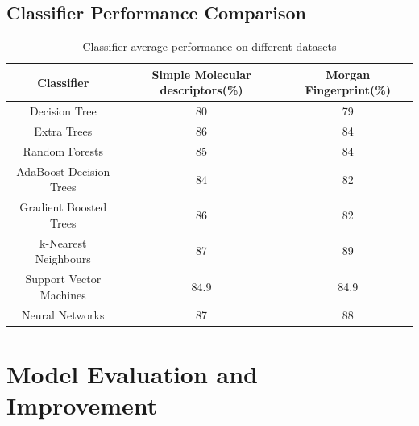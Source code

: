 \documentclass[a4paper,12pt]{report}
\begin{document}
			\subsection{Classifier Performance Comparison}
			\begin{table}[ht]
				\caption{Classifier average performance on different datasets}
				\centering
				\begin{tabular}{c|c|c}	
					\hline\hline
					Classifier & Simple Molecular descriptors(\%) & Morgan Fingerprint(\%) \\
					\hline
					Decision Tree & 80 & 79 \\
					Extra Trees & 86 & 84 \\
					Random Forests & 85 & 84 \\
					AdaBoost Decision Trees & 84 & 82 \\
					Gradient Boosted Trees & 86 & 82 \\
					k-Nearest Neighbours & 87 & 89 \\ 
					Support Vector Machines & 84.9 & 84.9 \\
					Neural Networks & 87 & 88 \\
					\hline
				\end{tabular}
			\end{table}




	\section{Model Evaluation and Improvement}












\end{document}
